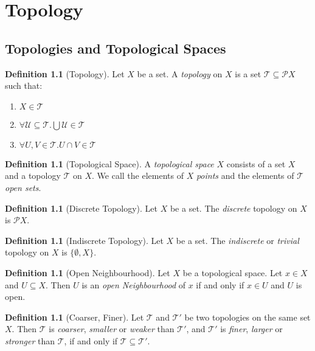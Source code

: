 \documentclass{book}
\theoremstyle{definition}
\newtheorem{definition}[lemma]{Definition}
\newcommand{\PP}{\ensuremath{\mathcal{P}}}
\newcommand{\TT}{\ensuremath{\mathcal{T}}}
\newcommand{\pow}[1]{\ensuremath{\PP {#1}}}
\begin{document}
\chapter{Topology}

\section{Topologies and Topological Spaces}

\begin{definition}[Topology]
    Let $X$ be a set. A \emph{topology} on $X$ is a set $\TT \subseteq \pow{X}$
    such that:
    \begin{enumerate}
        \item $X \in \TT$
        \item $\forall \mathcal{U} \subseteq \TT. \bigcup \mathcal{U} \in \TT$
        \item $\forall U,V \in \TT. U \cap V \in \TT$
    \end{enumerate}
\end{definition}

\begin{definition}[Topological Space]
    A \emph{topological space} $X$ consists of a set $X$ and a topology $\TT$ on $X$.
    We call the elements of $X$ \emph{points} and the elements of $\TT$ \emph{open sets}.
\end{definition}

\begin{definition}[Discrete Topology]
    Let $X$ be a set. The \emph{discrete} topology on $X$ is $\pow{X}$.
\end{definition}

\begin{definition}[Indiscrete Topology]
    Let $X$ be a set. The \emph{indiscrete} or \emph{trivial} topology on $X$ is $\{ \emptyset, X \}$.
\end{definition}

\begin{definition}[Open Neighbourhood]
    Let $X$ be a topological space. Let $x \in X$ and $U \subseteq X$. Then $U$ is an \emph{open Neighbourhood}
    of $x$ if and only if $x \in U$ and $U$ is open.
\end{definition}

\begin{definition}[Coarser, Finer]
    Let $\TT$ and $\TT'$ be two topologies on the same set $X$. Then $\TT$ is \emph{coarser}, \emph{smaller} or \emph{weaker} than $\TT'$,
    and $\TT'$ is \emph{finer}, \emph{larger} or \emph{stronger} than $\TT$, if and only if $\TT \subseteq \TT'$.
\end{definition}
\end{document}

